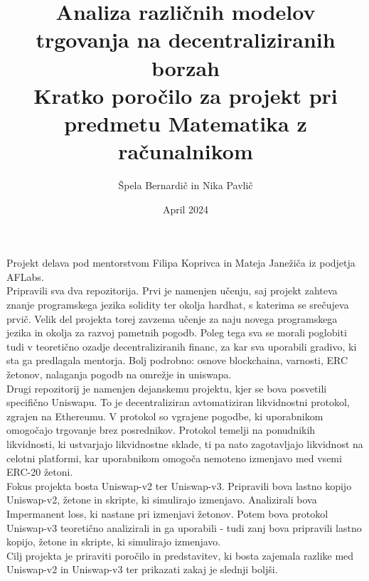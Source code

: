 \documentclass[a4paper,12pt]{article}%
\title{Analiza različnih modelov trgovanja na decentraliziranih borzah \\ \large Kratko poročilo za projekt pri predmetu Matematika z računalnikom}
\date{April 2024}
\author{Špela Bernardič in Nika Pavlič}
\begin{document}
\maketitle

Projekt delava pod mentorstvom Filipa Koprivca in Mateja Janežiča iz podjetja AFLabs. \\

Pripravili sva dva repozitorija. Prvi je namenjen učenju, saj projekt zahteva znanje programskega jezika solidity ter okolja hardhat, s katerima se srečujeva prvič. Velik del projekta torej zavzema učenje za naju novega programskega jezika in okolja za razvoj pametnih pogodb. Poleg tega sva se morali poglobiti tudi v teoretično ozadje decentraliziranih financ, za kar sva uporabili gradivo, ki sta ga predlagala mentorja. Bolj podrobno: osnove blockchaina, varnosti, ERC žetonov, nalaganja pogodb na omrežje in uniswapa.\\

Drugi repozitorij je namenjen dejanskemu projektu, kjer se bova posvetili specifično Uniswapu. To je decentraliziran avtomatiziran likvidnostni protokol, zgrajen na Ethereumu. V protokol so vgrajene pogodbe, ki uporabnikom omogočajo trgovanje brez posrednikov. Protokol temelji na ponudnikih likvidnosti, ki ustvarjajo likvidnostne sklade, ti pa nato zagotavljajo likvidnost na celotni platformi, kar uporabnikom omogoča nemoteno izmenjavo med vsemi ERC-20 žetoni. \\

Fokus projekta bosta Uniswap-v2 ter Uniswap-v3. Pripravili bova lastno kopijo Uniswap-v2,  žetone in skripte, ki simulirajo izmenjavo. Analizirali bova Impermanent loss, ki nastane pri izmenjavi žetonov. Potem bova protokol Uniswap-v3 teoretično analizirali in ga uporabili - tudi zanj bova pripravili lastno kopijo, žetone in skripte, ki simulirajo izmenjavo. \\

Cilj projekta je priraviti poročilo in predstavitev, ki bosta zajemala razlike med Uniswap-v2 in Uniswap-v3 ter prikazati zakaj je slednji boljši. 
\end{document}
